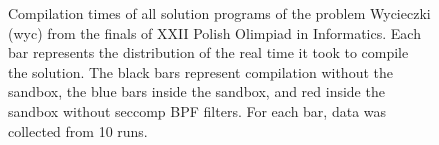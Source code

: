 \documentclass[en]{pracamgr}
\begin{document}
\begin{appendices}
\begin{figure}[H]
\caption{Compilation times of all solution programs of the problem Wycieczki (wyc) from the finals of XXII Polish Olimpiad in Informatics. Each bar represents the distribution of the real time it took to compile the solution. The black bars represent compilation without the sandbox, the blue bars inside the sandbox, and red inside the sandbox without seccomp BPF filters. For each bar, data was collected from 10 runs.}
\label{figure:wyc_compilation_real_time}
\end{figure}


\end{appendices}
\end{document}
